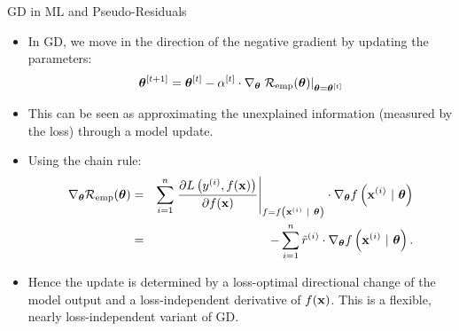 \documentclass[11pt,compress,t,notes=noshow, xcolor=table]{beamer}
\begin{document}
\begin{vbframe}{GD in ML and Pseudo-Residuals}

\begin{itemize}
	\item In GD, we move in the direction of the negative gradient by updating the parameters: 
	$$
	 \bm{\theta}^{[t + 1]} = \bm{\theta}^{[t]} - \alpha^{[t]} \cdot \nabla_{\bm{\theta}} \left.\mathcal{R}_{\text{emp}}(\bm{\theta})\right|_{\bm{\theta} = \bm{\theta}^{[t]}}	
	$$
	\item This can be seen as approximating the unexplained information (measured by the loss) through a model update. 
	\item Using the chain rule:
	\begin{eqnarray*}
	\nabla_{\bm{\theta}} \mathcal{R}_{\text{emp}}(\bm{\theta}) &=&\sum\limits_{i=1}^n \left.\frac{\partial L\left(y^{(i)}, f(\mathbf{x})\right)}{\partial f(\mathbf{x})} \right|_{f = f\left(\mathbf{x}^{(i)} ~|~ \bm{\theta}\right)} 
	\cdot \nabla_{\bm{\theta}} f\left(\mathbf{x}^{(i)} ~|~ \bm{\theta}\right) \\ 
	&=& - \sum\limits_{i=1}^n \tilde r^{(i)} \cdot \nabla_{\bm{\theta}} f\left(\mathbf{x}^{(i)} ~|~ \bm{\theta}\right).
	\end{eqnarray*}
	\item Hence the update is determined by a loss-optimal directional change of the model output 
        and a loss-independent derivative of $f(\mathbf{x})$.
        This is a flexible, nearly loss-independent variant of GD.
\end{itemize}	

\end{vbframe}
\end{document}
